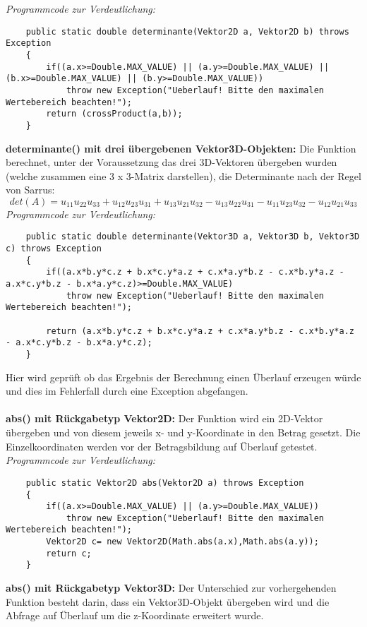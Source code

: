 \documentclass[a4paper,11pt]{scrartcl}
\begin{document}
\textit{Programmcode zur Verdeutlichung:}
\begin{lstlisting}
	public static double determinante(Vektor2D a, Vektor2D b) throws Exception
	{
		if((a.x>=Double.MAX_VALUE) || (a.y>=Double.MAX_VALUE) || (b.x>=Double.MAX_VALUE) || (b.y>=Double.MAX_VALUE))
			throw new Exception("Ueberlauf! Bitte den maximalen Wertebereich beachten!");
		return (crossProduct(a,b));
	}
\end{lstlisting} $\;$ \\
\textbf{determinante() mit drei übergebenen Vektor3D-Objekten:} Die Funktion  berechnet, unter der Voraussetzung das drei 3D-Vektoren übergeben wurden (welche zusammen eine 3 x 3-Matrix darstellen), die Determinante nach der Regel von Sarrus:
\[ det(A) = u_{11}u_{22}u_{33} + u_{12}u_{23}u_{31} + u_{13}u_{21}u_{32} - u_{13}u_{22}u_{31} - u_{11}u_{23}u_{32} - u_{12}u_{21}u_{33} \]
\textit{Programmcode zur Verdeutlichung:}
\begin{lstlisting}
	public static double determinante(Vektor3D a, Vektor3D b, Vektor3D c) throws Exception
	{
		if((a.x*b.y*c.z + b.x*c.y*a.z + c.x*a.y*b.z - c.x*b.y*a.z - a.x*c.y*b.z - b.x*a.y*c.z)>=Double.MAX_VALUE)
			throw new Exception("Ueberlauf! Bitte den maximalen Wertebereich beachten!");
		
		return (a.x*b.y*c.z + b.x*c.y*a.z + c.x*a.y*b.z - c.x*b.y*a.z - a.x*c.y*b.z - b.x*a.y*c.z);
	}
\end{lstlisting}
Hier wird geprüft ob das Ergebnis der Berechnung einen Überlauf erzeugen würde und dies im Fehlerfall durch eine Exception abgefangen.\\
\\
\textbf{abs() mit Rückgabetyp Vektor2D:} Der Funktion wird ein 2D-Vektor übergeben und von diesem jeweils x- und y-Koordinate in den Betrag gesetzt. Die Einzelkoordinaten werden vor der Betragsbildung auf Überlauf getestet.\\
\textit{Programmcode zur Verdeutlichung:}
\begin{lstlisting}
	public static Vektor2D abs(Vektor2D a) throws Exception
	{
		if((a.x>=Double.MAX_VALUE) || (a.y>=Double.MAX_VALUE))
			throw new Exception("Ueberlauf! Bitte den maximalen Wertebereich beachten!");
		Vektor2D c= new Vektor2D(Math.abs(a.x),Math.abs(a.y));
		return c;
	}
\end{lstlisting} $\;$ \\
\textbf{abs() mit Rückgabetyp Vektor3D:} Der Unterschied zur vorhergehenden Funktion besteht darin, dass ein Vektor3D-Objekt übergeben wird und die Abfrage auf Überlauf um die z-Koordinate erweitert wurde.\\
\end{document}
